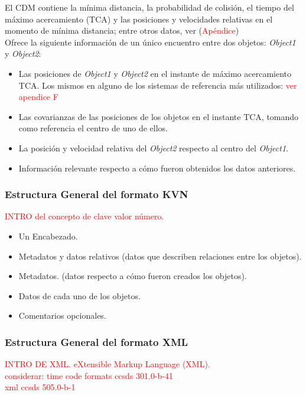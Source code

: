 El CDM contiene la m\'inima distancia, la probabilidad de colisi\'on, el tiempo del m\'aximo acercamiento (TCA) y las posiciones y velocidades relativas en el momento de m\'inima distancia; entre otros datos, ver (\textcolor{red}{Ap\'endice})\\

Ofrece la siguiente informaci\'on de un \'unico encuentro entre dos objetos: {\it{Object1}} y {\it{Object2}}:
\begin{itemize}
\item Las posiciones de  {\it{Object1}} y  {\it{Object2}} en el instante de m\'aximo acercamiento TCA. Los mismos en alguno de los sistemas de referencia m\'as utilizados: \textcolor{red}{ver apendice F}
\item Las covarianzas de las posiciones de los objetos en el instante TCA, tomando como referencia el centro de uno de ellos.
\item La posici\'on y velocidad relativa del {\it{Object2}} respecto al centro del {\it{Object1}}.
\item Informaci\'on relevante respecto a c\'omo fueron obtenidos los datos anteriores.
\end{itemize}


\subsubsection*{Estructura General del formato KVN}
\textcolor{red}{INTRO del concepto de clave valor n\'umero.}
\begin{itemize}
\item Un Encabezado.
\item Metadatos y datos relativos (datos que describen relaciones entre los objetos).
\item Metadatos. (datos respecto a c\'omo fueron creados los objetos).
\item Datos de cada uno de los objetos.
\item Comentarios opcionales.
\end{itemize}

\subsubsection*{Estructura General del formato XML}
\textcolor{red}{INTRO DE XML. eXtensible Markup Language (XML).}\\
\textcolor{red}{considerar: time code formats ccsds 301.0-b-41}\\
\textcolor{red}{xml ccsds 505.0-b-1}\\

